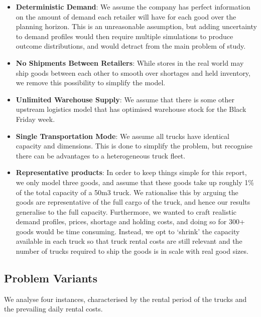 \documentclass[a4paper,12pt]{article}
\begin{document}
\begin{itemize}
    \item \textbf{Deterministic Demand}: We assume the company has perfect information on the amount of demand each retailer will have for each good over the planning horizon.
This is an unreasonable assumption, but adding uncertainty to demand profiles would then require multiple simulations to produce outcome distributions, and would detract from the main problem of study.

    \item \textbf{No Shipments Between Retailers}: While stores in the real world may ship goods between each other to smooth over shortages and held inventory, we remove this possibility to simplify the model.

    \item \textbf{Unlimited Warehouse Supply}: We assume that there is some other upstream logistics model that has optimised warehouse stock for the Black Friday week.

    \item \textbf{Single Transportation Mode}: We assume all trucks have identical capacity and dimensions.
This is done to simplify the problem, but recognise there can be advantages to a heterogeneous truck fleet.

    \item \textbf{Representative products}: In order to keep things simple for this report, we only model three goods, and assume that these goods take up roughly 1\% of the total capacity of a 50m3 truck.
We rationalise this by arguing the goods are representative of the full cargo of the truck, and hence our results generalise to the full capacity.
Furthermore, we wanted to craft realistic demand profiles, prices, shortage and holding costs, and doing so for 300+ goods would be time consuming.
Instead, we opt to `shrink' the capacity available in each truck so that truck rental costs are still relevant and the number of trucks required to ship the goods is in scale with real good sizes.
\end{itemize}


\subsection{Problem Variants}\label{subsec:problem-variants}

We analyse four instances, characterised by the rental period of the trucks and the prevailing daily rental costs.
\end{document}
